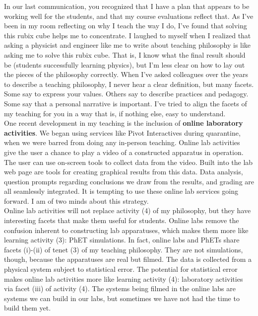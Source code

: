 \documentclass[../../../main.tex]{subfiles}
\begin{document}
In our last communication, you recognized that I have a plan that appears to be working well for the students, and that my course evaluations reflect that.  As I've been in my room reflecting on why I teach the way I do, I've found that solving this rubix cube helps me to concentrate.  I laughed to myself when I realized that asking a physicist and engineer like me to write about teaching philosophy is like asking me to solve this rubix cube.  That is, I know what the final result should be (students successfully learning physics), but I'm less clear on how to lay out the pieces of the philosophy correctly.  When I've asked colleagues over the years to describe a teaching philosophy, I never hear a clear definition, but many facets.  Some say to express your values.  Others say to describe practices and pedagogy.  Some say that a personal narrative is important.  I've tried to align the facets of my teaching for you in a way that is, if nothing else, easy to understand.
\\
\vspace{0.25cm}
One recent development in my teaching is the inclusion of \textbf{online laboratory activities}.  We began using services like Pivot Interactives during quarantine, when we were barred from doing any in-person teaching.  Online lab activities give the user a chance to play a video of a constructed apparatus in operation.  The user can use on-screen tools to collect data from the video.  Built into the lab web page are tools for creating graphical results from this data.  Data analysis, question prompts regarding conclusions we draw from the results, and grading are all seamlessly integrated.  It is tempting to use these online lab services going forward.  I am of two minds about this strategy.
\\
\vspace{0.25cm}
Online lab activities will not replace activity (4) of my philosophy, but they have interesting facets that make them useful for students.  Online labs remove the confusion inherent to constructing lab apparatuses, which makes them more like learning activity (3): PhET simulations.  In fact, online labs and PhETs share facets (i)-(ii) of tenet (3) of my teaching philosophy.  They are not simulations, though, because the apparatuses are real but filmed.  The data is collected from a physical system subject to statistical error.  The potential for statistical error makes online lab activities more like learning activity (4): laboratory activities via facet (iii) of activity (4).  The systems being filmed in the online labs are systems we can build in our labs, but sometimes we have not had the time to build them yet.
\end{document}
